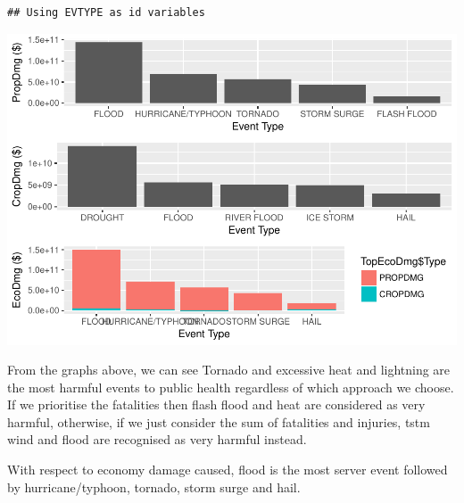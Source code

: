 \documentclass[]{article}
\newenvironment{Shaded}{\begin{snugshade}}{\end{snugshade}}
\newcommand{\KeywordTok}[1]{\textcolor[rgb]{0.13,0.29,0.53}{\textbf{#1}}}
\newcommand{\DataTypeTok}[1]{\textcolor[rgb]{0.13,0.29,0.53}{#1}}
\newcommand{\DecValTok}[1]{\textcolor[rgb]{0.00,0.00,0.81}{#1}}
\newcommand{\StringTok}[1]{\textcolor[rgb]{0.31,0.60,0.02}{#1}}
\newcommand{\OperatorTok}[1]{\textcolor[rgb]{0.81,0.36,0.00}{\textbf{#1}}}
\newcommand{\NormalTok}[1]{#1}
\begin{document}
\begin{verbatim}
## Using EVTYPE as id variables
\end{verbatim}

\begin{Shaded}
\end{Shaded}

\includegraphics{Project5_4_files/figure-latex/plotEcoDmg-1.pdf}

From the graphs above, we can see Tornado and excessive heat and
lightning are the most harmful events to public health regardless of
which approach we choose. If we prioritise the fatalities then flash
flood and heat are considered as very harmful, otherwise, if we just
consider the sum of fatalities and injuries, tstm wind and flood are
recognised as very harmful instead.

With respect to economy damage caused, flood is the most server event
followed by hurricane/typhoon, tornado, storm surge and hail.
\end{document}
